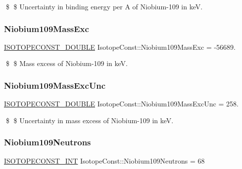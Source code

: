\$ \$ Uncertainty in binding energy per A of Niobium-\/109 in keV. \mbox{\label{group___isotope_const-_niobium-_nb109_gafa2bf1cb8090255db250c88a94fd1216}} 
\subsubsection{\texorpdfstring{Niobium109\+Mass\+Exc}{Niobium109MassExc}}
{\footnotesize\ttfamily \mbox{\hyperlink{group___isotope_const-_macros_ga8f45a7272ce02c0b4c65c44636ed719a}{I\+S\+O\+T\+O\+P\+E\+C\+O\+N\+S\+T\+\_\+\+D\+O\+U\+B\+LE}} Isotope\+Const\+::\+Niobium109\+Mass\+Exc = -\/56689.}

\$ \$ Mass excess of Niobium-\/109 in keV. \mbox{\label{group___isotope_const-_niobium-_nb109_ga1063f863f8a7095f349c6580a5ca2925}} 
\subsubsection{\texorpdfstring{Niobium109\+Mass\+Exc\+Unc}{Niobium109MassExcUnc}}
{\footnotesize\ttfamily \mbox{\hyperlink{group___isotope_const-_macros_ga8f45a7272ce02c0b4c65c44636ed719a}{I\+S\+O\+T\+O\+P\+E\+C\+O\+N\+S\+T\+\_\+\+D\+O\+U\+B\+LE}} Isotope\+Const\+::\+Niobium109\+Mass\+Exc\+Unc = 258.}

\$ \$ Uncertainty in mass excess of Niobium-\/109 in keV. \mbox{\label{group___isotope_const-_niobium-_nb109_gaab54d39e9c6b812b1f35ad6735c1c291}} 
\subsubsection{\texorpdfstring{Niobium109\+Neutrons}{Niobium109Neutrons}}
{\footnotesize\ttfamily \mbox{\hyperlink{group___isotope_const-_macros_ga5f18360b3e99483a35c32d789e62621c}{I\+S\+O\+T\+O\+P\+E\+C\+O\+N\+S\+T\+\_\+\+I\+NT}} Isotope\+Const\+::\+Niobium109\+Neutrons = 68}

